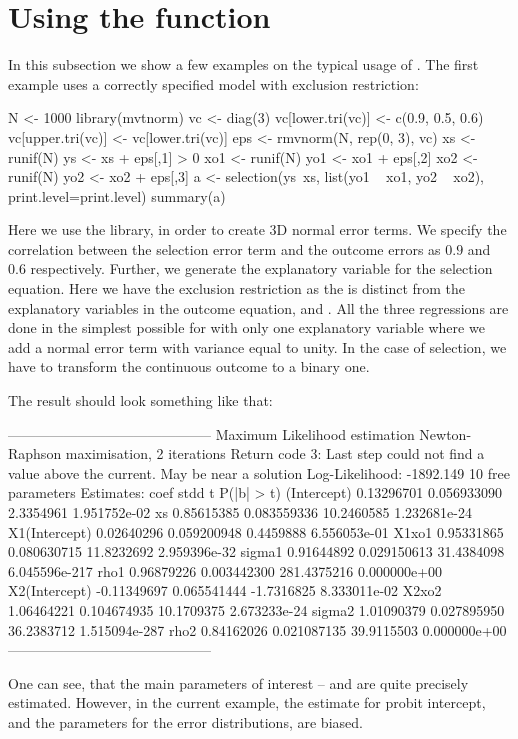 \section[Usage]{Using the  function}

In this subsection we show a few examples on the typical usage of
.  The first example uses a correctly specified model
with exclusion restriction:

\begin{Schunk}
\begin{Sinput}
  N <- 1000
  library(mvtnorm)
  vc <- diag(3)
  vc[lower.tri(vc)] <- c(0.9, 0.5, 0.6)
  vc[upper.tri(vc)] <- vc[lower.tri(vc)]
  eps <- rmvnorm(N, rep(0, 3), vc)
  xs <- runif(N)
  ys <- xs + eps[,1] > 0
  xo1 <- runif(N)
  yo1 <- xo1 + eps[,2]
  xo2 <- runif(N)
  yo2 <- xo2 + eps[,3]
  a <- selection(ys~xs, list(yo1 ~ xo1, yo2 ~ xo2), print.level=print.level)
  summary(a)
\end{Sinput}
\end{Schunk}

Here we use the  library, in order to create 3D normal
error terms.  We specify the correlation between the selection error
term and the outcome errors as $0.9$ and $0.6$ respectively.  Further,
we generate the explanatory variable  for the selection
equation.  Here we have the exclusion restriction as the  is
distinct from the explanatory variables in the outcome equation,
 and .  All the three regressions are done in the
simplest possible for with only one explanatory variable where we add
a normal error term with variance equal to unity.  In the case of
selection, we have to transform the continuous outcome to a binary
one.

The result should look something like that:
\begin{Schunk}
\begin{Soutput}
   --------------------------------------------
   Maximum Likelihood estimation
   Newton-Raphson maximisation, 2 iterations
   Return code 3: Last step could not find a value above the current.
   May be near a solution
   Log-Likelihood: -1892.149 
   10  free parameters
   Estimates:
   coef        stdd           t    P(|b| > t)
   (Intercept)    0.13296701 0.056933090   2.3354961  1.951752e-02
   xs             0.85615385 0.083559336  10.2460585  1.232681e-24
   X1(Intercept)  0.02640296 0.059200948   0.4459888  6.556053e-01
   X1xo1          0.95331865 0.080630715  11.8232692  2.959396e-32
   sigma1         0.91644892 0.029150613  31.4384098 6.045596e-217
   rho1           0.96879226 0.003442300 281.4375216  0.000000e+00
   X2(Intercept) -0.11349697 0.065541444  -1.7316825  8.333011e-02
   X2xo2          1.06464221 0.104674935  10.1709375  2.673233e-24
   sigma2         1.01090379 0.027895950  36.2383712 1.515094e-287
   rho2           0.84162026 0.021087135  39.9115503  0.000000e+00
   --------------------------------------------
\end{Soutput}
\end{Schunk}
One can see, that the main parameters of interest --  and
 are quite precisely estimated.  However, in the current
example, the estimate for probit intercept, and the parameters for the
error distributions, are biased.